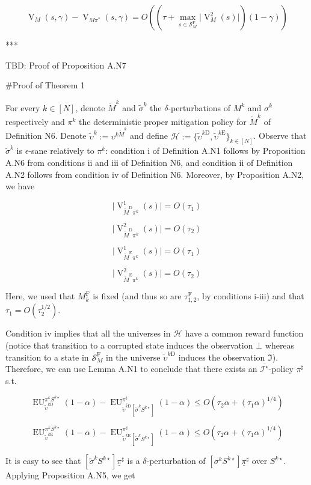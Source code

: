 \documentclass[a4paper]{article}
\newcommand{\AP}[1]{\left(#1\right)}
\newcommand{\AB}[1]{\left[#1\right]}
\newcommand{\Abs}[1]{\lvert #1 \rvert}
\newcommand{\St}{\mathcal{S}}
\newcommand{\In}{\mathcal{I}}
\newcommand{\Hy}{\mathcal{H}}
\newcommand{\RMD}{\mathrm{D}}
\newcommand{\RME}{\mathrm{E}}
\newcommand{\RMF}{\mathrm{F}}
\newcommand{\SF}{\St^{\RMF}}
\newcommand{\V}{\operatorname{V}}
\newcommand{\EU}{\operatorname{EU}}
\begin{document}
$$\V_M(s,\gamma) - \V_{M\pi^*}(s,\gamma) = O\AP{\AP{\tau + \max_{s\in\SF_M}\Abs{\V_{M}^2(s)}}(1-\gamma)}$$

***

TBD: Proof of Proposition A.N7

\#Proof of Theorem 1

For every $k \in [N]$, denote $\tilde{M}^k$ and $\tilde{\sigma}^k$ the $\delta$-perturbations of $M^k$ and $\sigma^k$ respectively and $\pi^k$ the deterministic proper mitigation policy for $\tilde{M}^k$ of Definition N6. Denote $\tilde{\upsilon}^k:=\upsilon^{k\tilde{M}^k}$ and define $\Hy:=\{\tilde{\upsilon}^{k\RMD},\tilde{\upsilon}^{k\RME}\}_{k \in [N]}$. Observe that $\tilde{\sigma}^{k}$ is $\epsilon$-sane relatively to $\pi^k$: condition i of Definition A.N1 follows by Proposition A.N6 from conditions ii and iii of Definition N6, and condition ii of Definition A.N2 follows from condition iv of Definition N6. Moreover, by Proposition A.N2, we have

$$\Abs{\V_{\tilde{M}^\RMD\pi^k}^1(s)} = O\AP{\tau_1}$$

$$\Abs{\V_{\tilde{M}^\RMD\pi^k}^2(s)} = O\AP{\tau_2}$$

$$\Abs{\V_{\tilde{M}^\RME\pi^k}^1(s)} = O\AP{\tau_1}$$

$$\Abs{\V_{\tilde{M}^\RME\pi^k}^2(s)} = O\AP{\tau_2}$$

Here, we used that $M^\RMF_k$ is fixed (and thus so are $\tau_{1,2}^\RMF$, by conditions i-iii) and that $\tau_1 = O\AP{\tau_2^{1/2}}$.

Condition iv implies that all the universes in $\Hy$ have a common reward function (notice that transition to a corrupted state induces the observation $\bot$ whereas transition to a state in $\SF_M$ in the universe $\tilde{\upsilon}^{k\RMD}$ induces the observation $\Im$). Therefore, we can use Lemma A.N1 to conclude that there exists an $\overline{\In^\star}$-policy $\pi^\sharp$ s.t.

$$\EU_{\tilde{\upsilon}^{k\RMD}}^{\pi^kS^{k\star}}(1-\alpha) - \EU_{\overline{\tilde{\upsilon}^{k\RMD}}\AB{\tilde{\sigma}^k S^{k\star}}}^{\pi^\sharp}(1-\alpha) \leq O\AP{\tau_2 \alpha + (\tau_1 \alpha)^{1/4}}$$

$$\EU_{\tilde{\upsilon}^{k\RME}}^{\pi^kS^{k\star}}(1-\alpha) - \EU_{\overline{\tilde{\upsilon}^{k\RME}}\AB{\tilde{\sigma}^k S^{k\star}}}^{\pi^\sharp}(1-\alpha) \leq O\AP{\tau_2 \alpha + (\tau_1 \alpha)^{1/4}}$$

It is easy to see that $\AB{\tilde{\sigma}^k S^{k\star}}\underline{\pi}^\sharp$ is a $\delta$-perturbation of $\AB{\sigma^k S^{k\star}}\underline{\pi}^\sharp$ over $S^{k\star}$. Applying Proposition A.N5, we get
\end{document}
